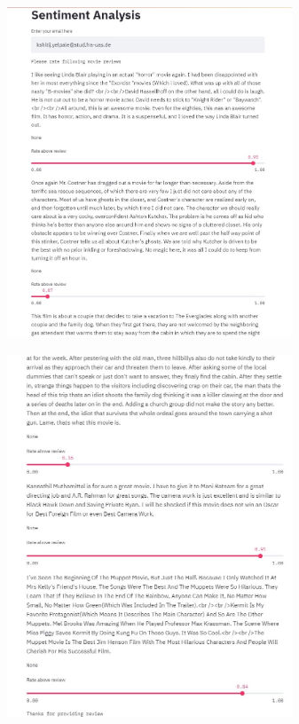 \documentclass[sigplan,screen]{acmart}
\begin{document}
\begin{figure}[h]
    \includegraphics[width=8.5cm]{HMI_SC_1.jpg}
    \caption{}
    \label{fig:ss 1}
\end{figure}

\begin{figure}[h]
    \includegraphics[width=8.5cm]{HMI_SC_2.jpg}
    \caption{}
    \label{fig:ss 2}
\end{figure}
\end{document}

